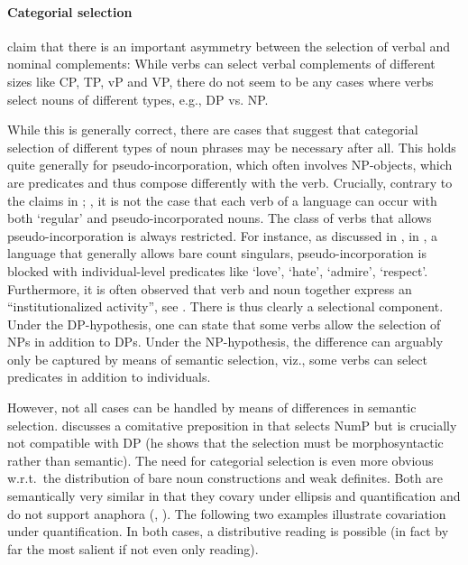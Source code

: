 \documentclass[output=paper,colorlinks,citecolor=black,
]{langscibook}
\begin{document}
\paragraph{Categorial selection} 
\label{salzmann:sec-categorial-selection}

 \citet[6]{Bruening-et-al:2018:Selection-Idioms-NP} claim that there is an important asymmetry between the selection of verbal and nominal complements: While verbs can select verbal complements of different sizes like CP, TP, vP and VP, there do not seem to be any cases where verbs select nouns of different types, e.g., DP vs. NP. 
 
 While this is generally correct, there are cases that suggest that categorial selection of different types of noun phrases may be necessary after all. This holds quite generally for pseudo-incorporation, which often involves NP-objects, which are predicates and thus compose differently with the verb. Crucially, contrary to the claims in \citet{Bruening-et-al:2018:Selection-Idioms-NP}; \citet{Bruening:2020:NP-DP}, it is not the case that each verb of a language can occur with both `regular' and pseudo-incorporated nouns. The class of verbs that allows pseudo-incorporation is always restricted. For instance, as discussed in \citet{Kallulli:1999:Dissertation-Albanian}, in , a language that generally allows bare count singulars, pseudo-incorporation is blocked with individual-level predicates like `love', `hate', `admire', `respect'. Furthermore,  it is often observed that verb and noun together express an ``institutionalized activity'', see \citet[164-165]{Dayal:2011:HindiPsuedoIncor}. There is thus clearly a selectional component.  Under the DP-hypothesis, one can state that some verbs allow the selection of NPs in addition to DPs. Under the NP-hypothesis, the difference can arguably only be captured by means of semantic selection, viz., some verbs can select predicates in addition to individuals.

However, not all cases can be handled by means of differences in semantic selection. \citet{Erschler:2019:DP-Ossetic} discusses a comitative preposition in  that selects NumP but is crucially not compatible with DP (he shows that the selection must be morphosyntactic rather than semantic). The need for categorial selection is even more obvious w.r.t.\ the distribution of bare noun constructions and weak definites. Both are semantically very similar in that they covary under ellipsis and quantification and do not support anaphora (\citealt{Carlson-et-al:2006:WeakDefinites}, \citealt{Aguilar:2014:WeakDefinites}). The following two examples illustrate covariation under quantification. In both cases, a distributive reading is possible (in fact by far the most salient if not even only reading).
\end{document}
